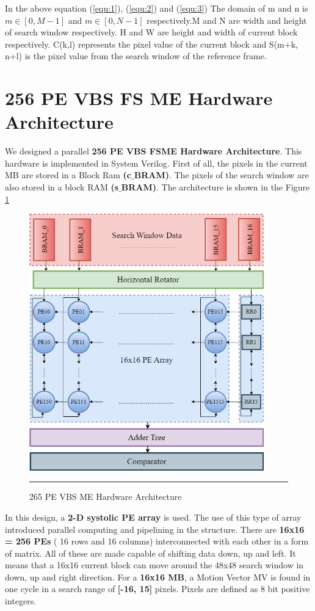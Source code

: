 In the above equation (\ref{equ:1}), (\ref{equ:2}) and (\ref{equ:3}) The domain of m and n is $m \in [0, M-1] $ and $m \in [0, N-1]$ respectively.M and N are width and height of search window respectively. H and W are height and width of current block respectively. C(k,l) represents the pixel value of the current block and S(m+k, n+l) is the pixel value from the search window of the reference frame.\cite{li2003serial} \\

\section{256 PE VBS FS ME Hardware Architecture}
We designed a parallel \textbf{256 PE VBS FSME Hardware Architecture}. \cite{kalaycioglu2011low} This hardware is implemented in System Verilog. First of all, the pixels in the current MB are stored in a Block Ram \textbf{(c$\_$BRAM)}. The pixels of the search window are also stored in a block RAM \textbf{(s$\_$BRAM)}. The architecture is shown in the Figure \ref{fig:256pevbsme}

\begin{figure}[H]
	\centering
	\includegraphics[width = 4in]{./Figures/256pevbsme.png}
	\rule{35em}{0.5pt}
	\caption{265 PE VBS ME Hardware Architecture}
	\label{fig:256pevbsme}
\end{figure}

In this design, a \textbf{2-D systolic PE array} is used. The use of this type of array introduced parallel computing and pipelining in the structure. There are \textbf{16x16 = 256 PEs} ( 16 rows and 16 columns) interconnected with each other in a form of matrix. All of these are  made capable of shifting data down, up and left. It means that a 16x16 current block can move around the 48x48 search window in down, up and right direction. For a \textbf{16x16 MB}, a Motion Vector MV is found in one cycle in a search range of \textbf{[-16, 15]} pixels. Pixels are defined as 8 bit positive integers.


